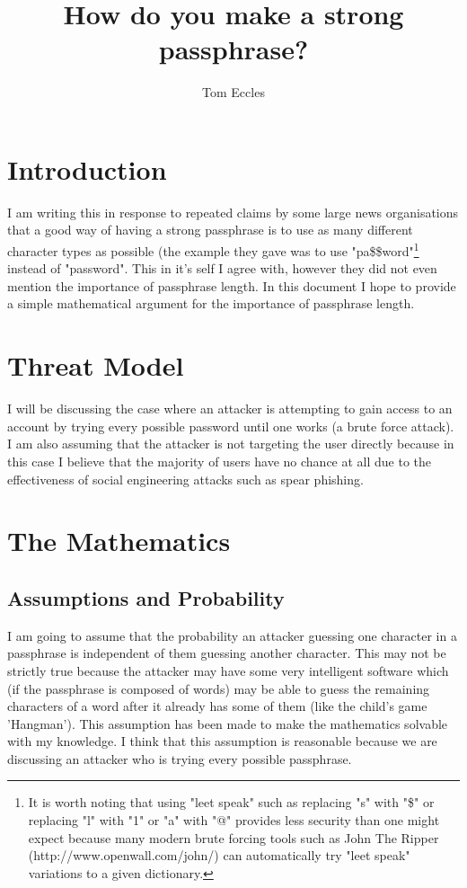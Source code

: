\documentclass[11pt,a4paper]{article}
\begin{document}
\title{How do you make a strong passphrase?}
\author{Tom Eccles}
\maketitle

\section{Introduction}
I am writing this in response to repeated claims by some large news organisations that a good way of having a strong passphrase is to use as many different character types as possible (the example they gave was to use "pa\$\$word"\footnote{It is worth noting that using "leet speak" such as replacing "s" with "\$" or replacing "l" with "1" or "a" with "@" provides less security than one might expect because many modern brute forcing tools such as John The Ripper (http://www.openwall.com/john/) can automatically try "leet speak" variations to a given dictionary.} instead of "password". This in it's self I agree with, however they did not even mention the importance of passphrase length. In this document I hope to provide a simple mathematical argument for the importance of passphrase length. 

\section{Threat Model}
I will be discussing the case where an attacker is attempting to gain access to an account by trying every possible password until one works (a brute force attack). I am also assuming that the attacker is not targeting the user directly because in this case I believe that the majority of users have no chance at all due to the effectiveness of social engineering attacks such as spear phishing. 

\section{The Mathematics}
\subsection{Assumptions and Probability}
I am going to assume that the probability an attacker guessing one character in a passphrase is independent of them guessing another character. This may not be strictly true because the attacker may have some very intelligent software which (if the passphrase is composed of words) may be able to guess the remaining characters of a word after it already has some of them (like the child's game 'Hangman'). This assumption has been made to make the mathematics solvable with my knowledge. I think that this assumption is reasonable because we are discussing an attacker who is trying every possible passphrase.
\end{document}
